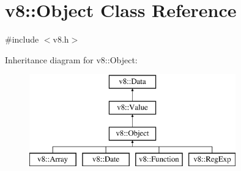 \hypertarget{classv8_1_1_object}{}\section{v8\+:\+:Object Class Reference}
\label{classv8_1_1_object}


{\ttfamily \#include $<$v8.\+h$>$}

Inheritance diagram for v8\+:\+:Object\+:\begin{figure}[H]
\begin{center}
\leavevmode
\includegraphics[height=4.000000cm]{classv8_1_1_object}
\end{center}
\end{figure}

